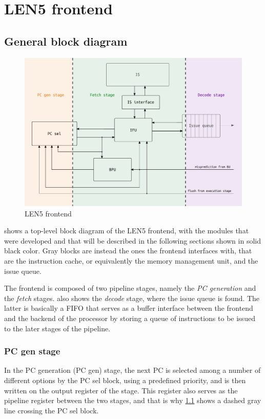 \chapter{LEN5 frontend}
\section{General block diagram}
\begin{figure}[hbt]
  \centering
  \includegraphics[width=\textwidth]{img/frontend.pdf}
  \caption{LEN5 frontend}
  \label{fig:frontend}
\end{figure}
 shows a top-level block diagram of the LEN5 frontend, with the modules that were developed and that will be described in the following sections shown in solid black color. Gray blocks are instead the ones the frontend interfaces with, that are the instruction cache, or equivalently the memory management unit, and the issue queue.

The frontend is composed of two pipeline stages, namely the \emph{\ac{PC} generation} and the \emph{fetch} stages.  also shows the \emph{decode} stage, where the issue queue is found. The latter is basically a \acs{FIFO} that serves as a buffer interface between the frontend and the backend of the processor by storing a queue of instructions to be issued to the later stages of the pipeline.

\subsection{\acs{PC} gen stage}
In the \ac{PC} generation (\ac{PC} gen) stage, the next \ac{PC} is selected among a number of different options by the \ac{PC} sel block, using a predefined priority, and is then written on the output register of the stage. This register also serves as the pipeline register between the two stages, and that is why \cref{fig:frontend} shows a dashed gray line crossing the \ac{PC} sel block. 

